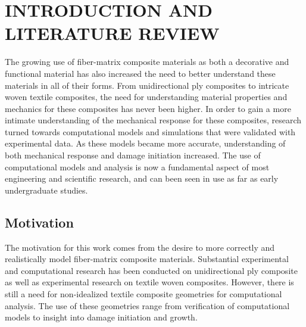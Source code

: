 %
%
%
%



\pagestyle{plain} %
\setcounter{page}{1}


\chapter{\uppercase {Introduction and Literature Review}}

 The growing use of fiber-matrix composite materials as both a decorative and functional material has also increased the need to better understand these materials in all of their forms. From unidirectional ply composites to intricate woven textile composites, the need for understanding material properties and mechanics for these composites has never been higher. In order to gain a more intimate understanding of the mechanical response for these composites, research turned towards computational models and simulations that were validated with experimental data. As these models became more accurate, understanding of both mechanical response and damage initiation increased. The use of computational models and analysis is now a fundamental aspect of most engineering and scientific research, and can been seen in use as far as early undergraduate studies.


\section{Motivation}

The motivation for this work comes from the desire to more correctly and realistically model fiber-matrix composite materials. Substantial experimental and computational research has been conducted on unidirectional ply composite as well as experimental research on textile woven composites. However, there is still a need for non-idealized textile composite geometries for computational analysis. The use of these geometries range from verification of computational models to insight into damage initiation and growth. 

